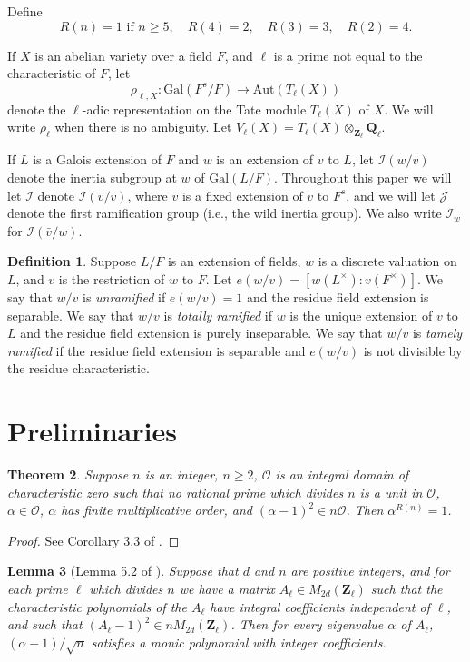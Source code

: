 \documentclass{amsart}
\def\Q{{\mathbf Q}}
\def\Z{{\mathbf Z}}
\def\Gal{\mathrm{Gal}}
\def\Aut{\mathrm{Aut}}
\def\I{{\mathcal I}}
\def\J{{\mathcal J}}
\def\O{{\mathcal O}}
\newtheorem{thm}{Theorem}[section]
\newtheorem{lem}[thm]{Lemma}
\theoremstyle{definition}
\newtheorem{defn}[thm]{Definition}
\begin{document}
Define 
$$R(n) = 1 \text{ if } n \ge 5, \quad R(4) = 2, 
\quad R(3) = 3, \quad R(2) = 4.$$

If $X$ is an abelian variety over a field $F$, and 
$\ell$ is a prime not equal to the characteristic of $F$,
let
$$\rho_{\ell,X} : \Gal(F^s/F) \to \Aut(T_\ell(X))$$
denote the $\ell$-adic representation on the Tate module $T_\ell(X)$
of $X$. We will write $\rho_\ell$ when there is no ambiguity.
Let $V_\ell(X) = T_\ell(X)\otimes_{\Z_\ell}\Q_\ell$.

If $L$ is a Galois extension of $F$
and $w$ is an extension of $v$ to $L$,
let $\I(w/v)$ denote the inertia subgroup at $w$ of $\Gal(L/F)$.
Throughout this paper we will let $\I$ denote 
$\I({\bar v}/v)$, where ${\bar v}$ is a fixed extension of $v$ to $F^s$,
and we will let $\J$ denote the first ramification group 
(i.e., the wild inertia group). We also write $\I_{w}$ for
$\I({\bar v}/w)$.

\begin{defn}
Suppose $L/F$ is an extension of fields, $w$ is a discrete valuation
on $L$, and $v$ is the restriction of $w$ to $F$. 
Let $e(w/v) = [w(L^\times):v(F^\times)]$. We say that
$w/v$ is {\em unramified} if $e(w/v) = 1$ 
and the residue field extension is separable.
We say that
$w/v$ is {\em  totally ramified} if $w$ is the unique extension
of $v$ to $L$ and the residue field extension is purely inseparable.
We say that
$w/v$ is {\em tamely ramified} if the residue field extension 
is separable and $e(w/v)$ is not divisible by the residue characteristic.
\end{defn}

\section{Preliminaries}

\begin{thm}
\label{quasithm}
Suppose $n$ is an integer, $n \ge 2$, $\O$ is an integral 
domain of characteristic zero such that no rational prime which 
divides $n$ 
is a unit in $\O$, $\alpha \in \O$, $\alpha$ has finite 
multiplicative order, 
and $(\alpha-1)^2 \in n\O$.
Then $\alpha^{R(n)} = 1$.
\end{thm}

\begin{proof}
See Corollary 3.3 of \cite{serrelem}.
\end{proof}

\begin{lem}[Lemma 5.2 of \cite{semistab}]
\label{localglobal}
Suppose that $d$ and $n$ are positive integers, and for each prime $\ell$ 
which divides
$n$ we have a matrix $A_\ell \in M_{2d}(\Z_\ell)$ such that the
characteristic polynomials of the $A_\ell$ have integral coefficients
independent of $\ell$, and such that $(A_\ell-1)^2 \in nM_{2d}(\Z_\ell)$.
Then for every eigenvalue $\alpha$ of $A_\ell$, $(\alpha-1)/\sqrt{n}$
satisfies a monic polynomial with integer coefficients.
\end{lem}
\end{document}
